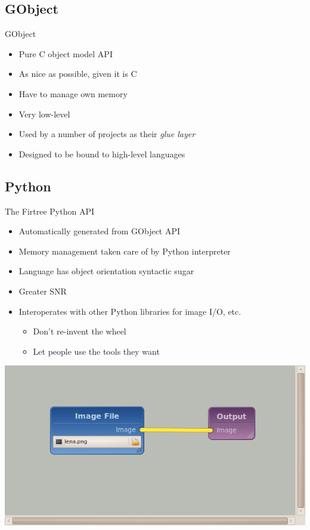 \documentclass{beamer}
\newcommand{\bi}{\begin{itemize}}
\newcommand{\ei}{\end{itemize}}
\begin{document}

\subsection{GObject} %

\begin{frame}{GObject}
  \bi
    \item Pure C object model API
    \item As nice as possible, given it is C
    \item Have to manage own memory
    \item Very low-level
    \item Used by a number of projects as their \emph{glue layer}
    \item Designed to be bound to high-level languages
  \ei
\end{frame}

\begin{frame}{The Firtree GObject API}
C}]{gobject-example.c}
\end{frame}


\subsection{Python} %

\begin{frame}{The Firtree Python API}
  \bi
    \item Automatically generated from GObject API
    \item Memory management taken care of by Python interpreter
    \item Language has object orientation syntactic sugar
    \item Greater SNR
    \item Interoperates with other Python libraries for image I/O, etc.
    \bi
      \item Don't re-invent the wheel
      \item Let people use the tools they want
    \ei
  \ei
\end{frame}

\begin{frame}
\includegraphics[width=\textwidth]{simple-pipeline}
\end{frame}
\end{document}
